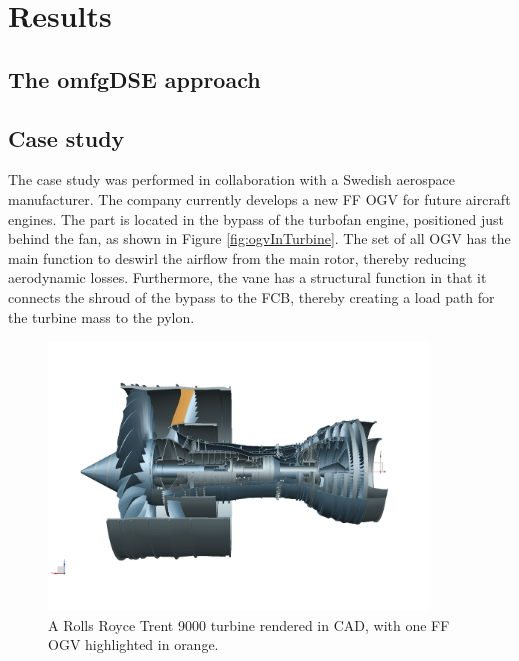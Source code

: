 \documentclass[fleqn,10pt]{olplainarticle}
\begin{document}
\section{Results}

\subsection{The omfgDSE approach}


\subsection{Case study}
The case study was performed in collaboration with a Swedish aerospace manufacturer. 
The company currently develops a new \ac{FF} \ac{OGV} for future aircraft engines.
The part is located in the bypass of the turbofan engine, positioned just behind the fan, as shown in Figure \ref{fig:ogvInTurbine}.
The set of all \ac{OGV} has the main function to deswirl the airflow from the main rotor, thereby reducing aerodynamic losses.
Furthermore, the vane has a structural function in that it connects the shroud of the bypass to the \ac{FCB}, thereby creating a load path for the turbine mass to the pylon.

\begin{figure}
    \centering
    \includegraphics[width=0.9\textwidth]{figures/trent9000_OGV.png}
    \caption{A Rolls Royce Trent 9000 turbine rendered in CAD, with one \ac{FF} \ac{OGV} highlighted in orange.}
    \label{fig:my_label}
\end{figure}
\end{document}
